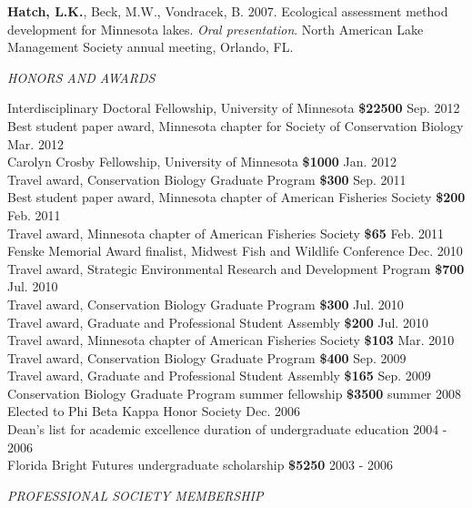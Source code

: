\documentclass[letterpaper,12pt]{article}
\newcommand{\sectitle}[1]{\vspace{\baselineskip} \centerline{\large{\textit{#1}}}}
\begin{document}
{\bf Hatch, L.K.}, Beck, M.W., Vondracek, B. 2007. Ecological assessment method development for Minnesota lakes. \textit{Oral presentation}. North American Lake Management Society annual meeting, Orlando, FL.

\sectitle{HONORS AND AWARDS}

Interdisciplinary Doctoral Fellowship, University of Minnesota {\bf \$22500} \hfill Sep. 2012 \\
Best student paper award, Minnesota chapter for Society of Conservation Biology \hfill Mar. 2012 \\
Carolyn Crosby Fellowship, University of Minnesota {\bf \$1000} \hfill Jan. 2012 \\
Travel award, Conservation Biology Graduate Program {\bf \$300} \hfill Sep. 2011 \\
Best student paper award, Minnesota chapter of American Fisheries Society {\bf \$200} \hfill Feb. 2011 \\
Travel award, Minnesota chapter of American Fisheries Society {\bf \$65} \hfill Feb. 2011 \\
Fenske Memorial Award finalist, Midwest Fish and Wildlife Conference \hfill Dec. 2010 \\
Travel award, Strategic Environmental Research and Development Program {\bf \$700} \hfill Jul. 2010 \\
Travel award, Conservation Biology Graduate Program {\bf \$300} \hfill Jul. 2010 \\
Travel award, Graduate and Professional Student Assembly {\bf \$200} \hfill Jul. 2010 \\
Travel award, Minnesota chapter of American Fisheries Society {\bf \$103} \hfill Mar. 2010 \\
Travel award, Conservation Biology Graduate Program {\bf \$400} \hfill Sep. 2009 \\
Travel award, Graduate and Professional Student Assembly {\bf \$165} \hfill Sep. 2009 \\
Conservation Biology Graduate Program summer fellowship {\bf \$3500} \hfill summer 2008 \\
Elected to Phi Beta Kappa Honor Society \hfill Dec. 2006 \\
Dean's list for academic excellence duration of undergraduate education \hfill 2004 - 2006 \\
Florida Bright Futures undergraduate scholarship {\bf \$5250} \hfill 2003 - 2006 

\sectitle{PROFESSIONAL SOCIETY MEMBERSHIP}
\end{document}
